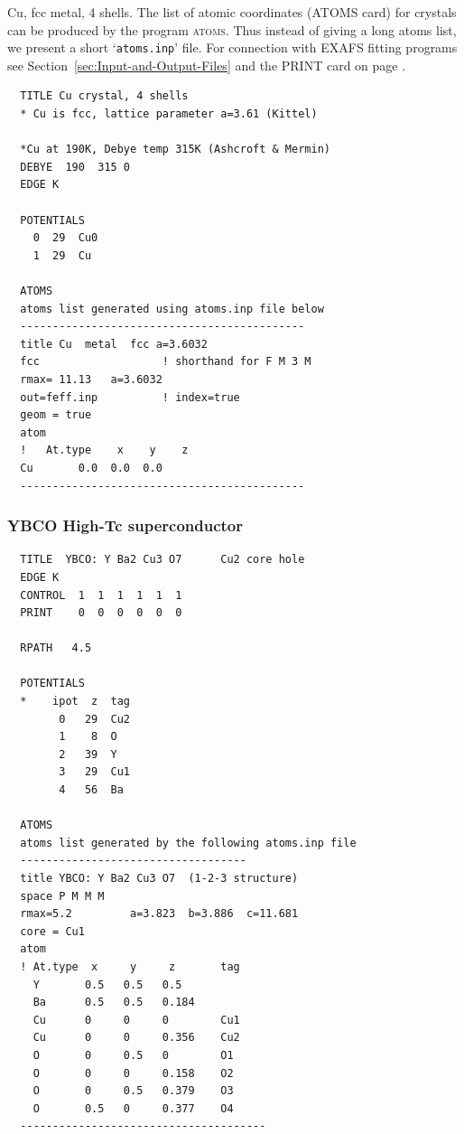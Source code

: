 \documentclass[11pt,oneside]{report} %
\renewcommand{\htmlref}[2]{\hyperlink{#2}{#1}}
\newcommand{\program}[1]{\textsc{#1}}
\newcommand{\file}[1]{`\texttt{#1}'}
\newcommand{\atoms}{\program{atoms}}
\renewcommand{\htmlref}[2]{{#1}} %
\begin{document}
Cu, fcc metal, 4 shells. The list of atomic coordinates
(\htmlref{ATOMS}{card:ato} card) for crystals can be produced by the program
{\atoms}. Thus instead of giving a long atoms list, we present a short
\file{atoms.inp} file.  For connection with EXAFS fitting programs see
Section~\ref{sec:Input-and-Output-Files} and the \htmlref{PRINT}{card:pri}
card on page \pageref{card:pri}.

\begin{verbatim}
  TITLE Cu crystal, 4 shells
  * Cu is fcc, lattice parameter a=3.61 (Kittel)
  
  *Cu at 190K, Debye temp 315K (Ashcroft & Mermin)
  DEBYE  190  315 0
  EDGE K
  
  POTENTIALS
    0  29  Cu0
    1  29  Cu
  
  ATOMS
  atoms list generated using atoms.inp file below
  --------------------------------------------
  title Cu  metal  fcc a=3.6032
  fcc                   ! shorthand for F M 3 M
  rmax= 11.13   a=3.6032
  out=feff.inp          ! index=true
  geom = true
  atom
  !   At.type    x    y    z
  Cu       0.0  0.0  0.0
  --------------------------------------------
\end{verbatim}



\subsubsection{YBCO High-Tc superconductor}
\label{sec:YBCO-High-Tc}


\begin{verbatim}
  TITLE  YBCO: Y Ba2 Cu3 O7      Cu2 core hole
  EDGE K
  CONTROL  1  1  1  1  1  1
  PRINT    0  0  0  0  0  0
  
  RPATH   4.5
  
  POTENTIALS
  *    ipot  z  tag
        0   29  Cu2
        1    8  O
        2   39  Y
        3   29  Cu1
        4   56  Ba
  
  ATOMS
  atoms list generated by the following atoms.inp file
  -----------------------------------
  title YBCO: Y Ba2 Cu3 O7  (1-2-3 structure)
  space P M M M
  rmax=5.2         a=3.823  b=3.886  c=11.681
  core = Cu1
  atom
  ! At.type  x     y     z       tag
    Y       0.5   0.5   0.5
    Ba      0.5   0.5   0.184
    Cu      0     0     0        Cu1
    Cu      0     0     0.356    Cu2
    O       0     0.5   0        O1
    O       0     0     0.158    O2
    O       0     0.5   0.379    O3
    O       0.5   0     0.377    O4
  --------------------------------------
\end{verbatim}
\end{document}
